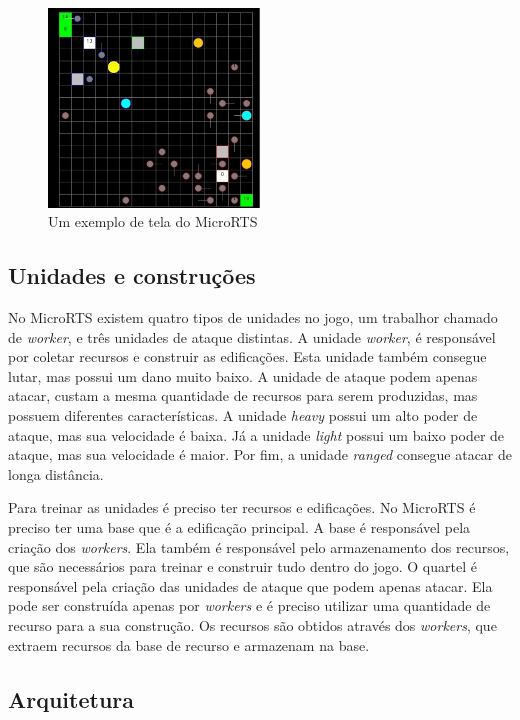 \begin{figure}[ht]
	\centering
	\includegraphics[width=0.5\textwidth]{fig/microrts.pdf}
	\caption{Um exemplo de tela do MicroRTS}
	\label{fig:microrts}
\end{figure} 

\subsection{Unidades e construções}

No MicroRTS existem quatro tipos de unidades no jogo, um trabalhor chamado de \textit{worker}, e três unidades de ataque distintas.
A unidade \textit{worker}, é responsável por coletar recursos e construir as edificações. Esta unidade também consegue lutar, mas possui um dano muito baixo.
A unidade de ataque podem apenas atacar, custam a mesma quantidade de recursos para serem produzidas, mas possuem diferentes características. 
A unidade \textit{heavy} possui um alto poder de ataque, mas sua velocidade é baixa.
Já a unidade \textit{light} possui um baixo poder de ataque, mas sua velocidade é maior.
Por fim, a unidade \textit{ranged} consegue atacar de longa distância. 

Para treinar as unidades é preciso ter recursos e edificações. 
No MicroRTS é preciso ter uma base que é a edificação principal. 
A base é responsável pela criação dos \textit{workers}.
Ela também é responsável pelo armazenamento dos recursos, que são necessários para treinar e construir tudo dentro do jogo. 
O quartel é responsável pela criação das unidades de ataque que podem apenas atacar. 
Ela pode ser construída apenas por \textit{workers} e é preciso utilizar uma quantidade de recurso para a sua construção. 
Os recursos são obtidos através dos \textit{workers}, que extraem recursos da base de recurso e armazenam na base. 

\subsection{Arquitetura}

